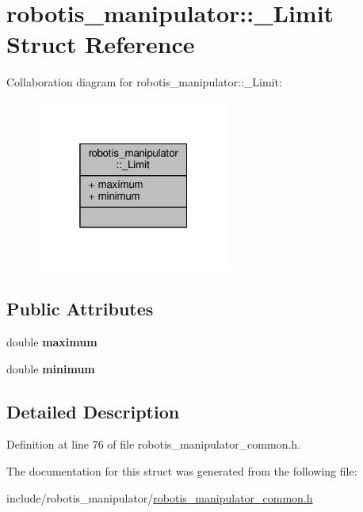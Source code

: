 \hypertarget{structrobotis__manipulator_1_1___limit}{}\section{robotis\+\_\+manipulator\+:\+:\+\_\+\+Limit Struct Reference}
\label{structrobotis__manipulator_1_1___limit}


Collaboration diagram for robotis\+\_\+manipulator\+:\+:\+\_\+\+Limit\+:
\nopagebreak
\begin{figure}[H]
\begin{center}
\leavevmode
\includegraphics[width=181pt]{structrobotis__manipulator_1_1___limit__coll__graph}
\end{center}
\end{figure}
\subsection*{Public Attributes}
\begin{DoxyCompactItemize}
\item 
double {\bfseries maximum}\hypertarget{structrobotis__manipulator_1_1___limit_a12aea3fd52ac1518feb12c05c719f255}{}\label{structrobotis__manipulator_1_1___limit_a12aea3fd52ac1518feb12c05c719f255}

\item 
double {\bfseries minimum}\hypertarget{structrobotis__manipulator_1_1___limit_abf497fd698d5006b96f61c494c222357}{}\label{structrobotis__manipulator_1_1___limit_abf497fd698d5006b96f61c494c222357}

\end{DoxyCompactItemize}


\subsection{Detailed Description}


Definition at line 76 of file robotis\+\_\+manipulator\+\_\+common.\+h.



The documentation for this struct was generated from the following file\+:\begin{DoxyCompactItemize}
\item 
include/robotis\+\_\+manipulator/\hyperlink{robotis__manipulator__common_8h}{robotis\+\_\+manipulator\+\_\+common.\+h}\end{DoxyCompactItemize}
